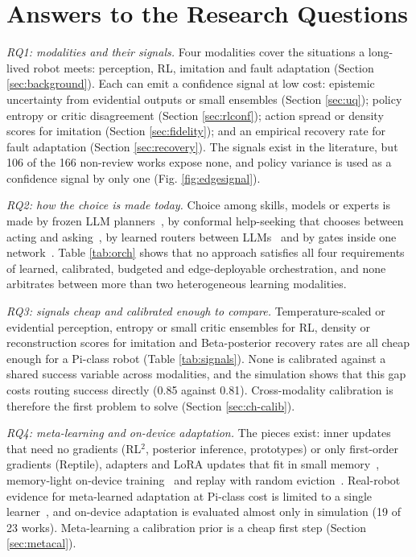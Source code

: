 \documentclass[journal]{IEEEtran}
\begin{document}
\section{Answers to the Research Questions}\label{sec:synthesis}

\textit{RQ1: modalities and their signals.} Four modalities cover the situations a long-lived robot meets: perception, RL, imitation and fault adaptation (Section \ref{sec:background}). Each can emit a confidence signal at low cost: epistemic uncertainty from evidential outputs or small ensembles (Section \ref{sec:uq}); policy entropy or critic disagreement (Section \ref{sec:rlconf}); action spread or density scores for imitation (Section \ref{sec:fidelity}); and an empirical recovery rate for fault adaptation (Section \ref{sec:recovery}). The signals exist in the literature, but 106 of the 166 non-review works expose none, and policy variance is used as a confidence signal by only one (Fig. \ref{fig:edgesignal}).

\textit{RQ2: how the choice is made today.} Choice among skills, models or experts is made by frozen LLM planners~\cite{Ahn2022,Huang2022b}, by conformal help-seeking that chooses between acting and asking~\cite{Ren2023,Yuan2026}, by learned routers between LLMs~\cite{Ong2025,Ding2024,Aggarwal2024} and by gates inside one network~\cite{Huang2025,Reuss2025,Zhang2026b}. Table \ref{tab:orch} shows that no approach satisfies all four requirements of learned, calibrated, budgeted and edge-deployable orchestration, and none arbitrates between more than two heterogeneous learning modalities.

\textit{RQ3: signals cheap and calibrated enough to compare.} Temperature-scaled or evidential perception, entropy or small critic ensembles for RL, density or reconstruction scores for imitation and Beta-posterior recovery rates are all cheap enough for a Pi-class robot (Table \ref{tab:signals}). None is calibrated against a shared success variable across modalities, and the simulation shows that this gap costs routing success directly (0.85 against 0.81). Cross-modality calibration is therefore the first problem to solve (Section \ref{sec:ch-calib}).

\textit{RQ4: meta-learning and on-device adaptation.} The pieces exist: inner updates that need no gradients (RL$^2$, posterior inference, prototypes) or only first-order gradients (Reptile), adapters and LoRA updates that fit in small memory~\cite{Hu2022,Zhu2025}, memory-light on-device training~\cite{Lin2022,Cai2020,Zhu2023} and replay with random eviction~\cite{Rolnick2019}. Real-robot evidence for meta-learned adaptation at Pi-class cost is limited to a single learner~\cite{Nagabandi2019}, and on-device adaptation is evaluated almost only in simulation (19 of 23 works). Meta-learning a calibration prior is a cheap first step (Section \ref{sec:metacal}).
\end{document}
